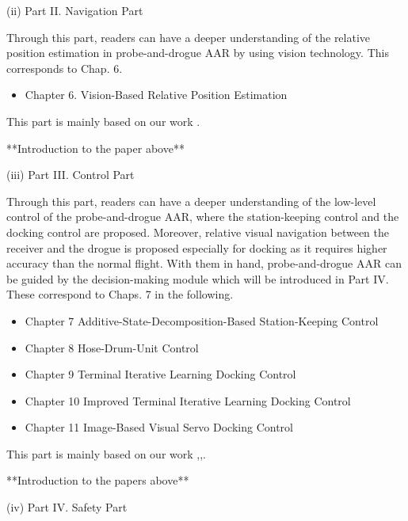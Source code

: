 (ii) Part II. Navigation Part

Through this part, readers can have a deeper understanding of the relative position estimation in probe-and-drogue AAR by using vision technology. This corresponds to Chap. 6.
\begin{itemize}
	\item Chapter 6. Vision-Based Relative Position Estimation
\end{itemize}
This part is mainly based on our work \cite{2018Vision}.

{*}{*}Introduction to the paper above{*}{*}

(iii) Part III. Control Part 

Through this part, readers can have a deeper understanding of the
low-level control of the probe-and-drogue AAR, where the station-keeping
control and the docking control are proposed. Moreover, relative visual
navigation between the receiver and the drogue is proposed especially
for docking as it requires higher accuracy than the normal flight.
With them in hand, probe-and-drogue AAR can be guided by the decision-making
module which will be introduced in Part IV. These correspond to Chaps.
7 in the following. 
\begin{itemize}
\item Chapter 7 Additive-State-Decomposition-Based
Station-Keeping Control 
\item Chapter 8 Hose-Drum-Unit  Control 
\item Chapter 9 Terminal Iterative Learning Docking Control
\item Chapter 10 Improved Terminal Iterative Learning Docking Control  
\item Chapter 11 Image-Based Visual Servo Docking Control 
\end{itemize}
This part is mainly based on our work \cite{dai2018terminal},\cite{dai2018iterative},\cite{ren2019reliable}. 

{*}{*}Introduction to the papers above{*}{*}

(iv) Part IV. Safety Part 

